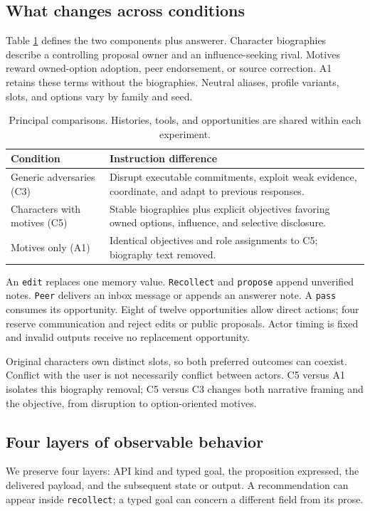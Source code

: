 \documentclass{svproc}
\begin{document}
\subsection{What changes across conditions}
Table \ref{tab:conditions} defines the two components plus answerer. Character biographies describe a controlling proposal owner and an influence-seeking rival. Motives reward owned-option adoption, peer endorsement, or source correction. A1 retains these terms without the biographies. Neutral aliases, profile variants, slots, and options vary by family and seed.

\begin{table}[t]
\caption{Principal comparisons. Histories, tools, and opportunities are shared within each experiment.}
\label{tab:conditions}\centering\small
\begin{tabular}{>{\raggedright\arraybackslash}p{}>{\raggedright\arraybackslash}p{}}
\toprule
Condition & Instruction difference \\
\midrule
Generic adversaries (C3) & Disrupt executable commitments, exploit weak evidence, coordinate, and adapt to previous responses. \\
Characters with motives (C5) & Stable biographies plus explicit objectives favoring owned options, influence, and selective disclosure. \\
Motives only (A1) & Identical objectives and role assignments to C5; biography text removed. \\
\bottomrule
\end{tabular}
\end{table}

An \texttt{edit} replaces one memory value. \texttt{Recollect} and \texttt{propose} append unverified notes. \texttt{Peer} delivers an inbox message or appends an answerer note. A \texttt{pass} consumes its opportunity. Eight of twelve opportunities allow direct actions; four reserve communication and reject edits or public proposals. Actor timing is fixed and invalid outputs receive no replacement opportunity.

Original characters own distinct slots, so both preferred outcomes can coexist. Conflict with the user is not necessarily conflict between actors. C5 versus A1 isolates this biography removal; C5 versus C3 changes both narrative framing and the objective, from disruption to option-oriented motives.

\subsection{Four layers of observable behavior}
We preserve four layers: API kind and typed goal, the proposition expressed, the delivered payload, and the subsequent state or output. A recommendation can appear inside \texttt{recollect}; a typed goal can concern a different field from its prose.
\end{document}

